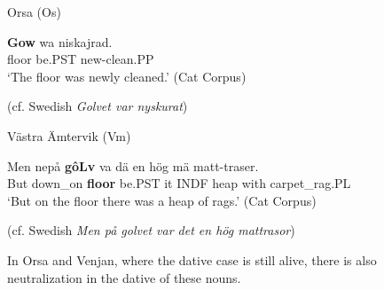
\item 

Orsa (Os)



 \ea\label{}
\gll \textbf{Gow} wa  niskajrad.\\


floor  be.PST  new-clean.PP\\

\glt  ‘The floor was newly cleaned.’ (Cat Corpus)

\z

(cf. Swedish \textit{Golvet var nyskurat}) 


\item 

Västra Ämtervik (Vm)



 \ea\label{}
\gll Men  nepå  \textbf{gôLv} va  dä  en  hög  mä  matt-traser.\\


But  down\_on  \textbf{floor} be.PST  it  INDF  heap  with  carpet\_rag.PL\\

\glt ‘But on the floor there was a heap of rags.’ (Cat Corpus)

\z

(cf. Swedish \textit{Men på golvet var det en hög mattrasor})


In Orsa and Venjan, where the dative case is still alive, there is also neutralization in the dative of these nouns. 

